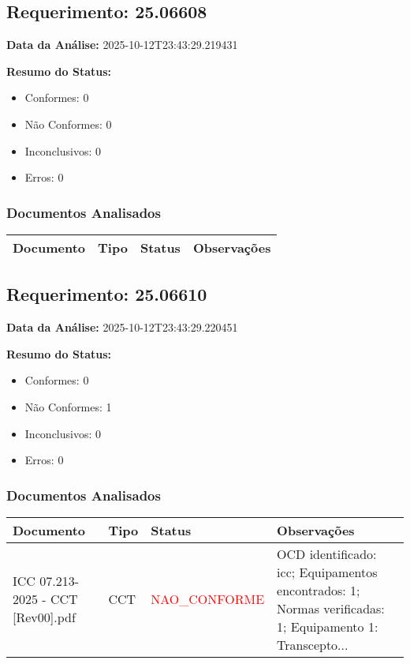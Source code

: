 \documentclass[12pt,a4paper]{article}
\begin{document}
\subsection{Requerimento: 25.06608}

\textbf{Data da Análise:} 2025-10-12T23:43:29.219431

\textbf{Resumo do Status:}
\begin{itemize}
    \item Conformes: 0
    \item Não Conformes: 0
    \item Inconclusivos: 0
    \item Erros: 0
\end{itemize}

\subsubsection{Documentos Analisados}

\begin{longtable}{|p{4cm}|p{2cm}|p{2cm}|p{6cm}|}
\hline
\textbf{Documento} & \textbf{Tipo} & \textbf{Status} & \textbf{Observações} \\
\hline
\endhead
\end{longtable}


\subsection{Requerimento: 25.06610}

\textbf{Data da Análise:} 2025-10-12T23:43:29.220451

\textbf{Resumo do Status:}
\begin{itemize}
    \item Conformes: 0
    \item Não Conformes: 1
    \item Inconclusivos: 0
    \item Erros: 0
\end{itemize}

\subsubsection{Documentos Analisados}

\begin{longtable}{|p{4cm}|p{2cm}|p{2cm}|p{6cm}|}
\hline
\textbf{Documento} & \textbf{Tipo} & \textbf{Status} & \textbf{Observações} \\
\hline
\endhead
ICC 07.213-2025 - CCT [Rev00].pdf & CCT & \textcolor{red}{NAO\_CONFORME} & OCD identificado: icc; Equipamentos encontrados: 1; Normas verificadas: 1; Equipamento 1: Transcepto... \\
\hline
\end{longtable}
\end{document}
